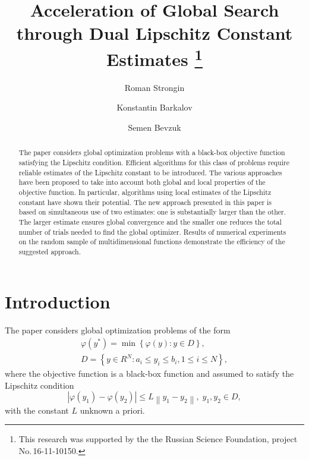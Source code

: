 \documentclass[runningheads]{llncs}
\begin{document}
%
\title{Acceleration of Global Search through Dual Lipschitz Constant Estimates
\thanks{This research was supported by the the Russian Science Foundation,
project No.\,16-11-10150.}}
%
%
\author{Roman Strongin%
\and Konstantin Barkalov%
\and Semen Bevzuk%
}
%
%
%
\maketitle              %
%
\begin{abstract}
The paper considers global optimization problems with a black-box objective 
function satisfying the Lipschitz condition. Efficient algorithms for this 
class of problems require reliable estimates of the Lipschitz constant to be 
introduced. The various approaches have been proposed to take into account both
global and local properties of the objective function. In particular, algorithms
using local estimates of the Lipschitz constant have shown their potential.
The new approach presented in this paper is based on simultaneous use of two
estimates: one is substantially larger than the other. 
The larger estimate ensures global convergence and the smaller one reduces 
the total number of trials needed to find the global optimizer.
Results of numerical experiments on the random sample of multidimensional 
functions demonstrate the efficiency of the suggested approach.  

\end{abstract}
%
%
%
\section{Introduction}

The paper considers global optimization problems of the form 
\begin{gather}
 \varphi(y^\ast)=\min{\left\{\varphi(y):y\in D\right\}}, \label{problem}\\
 D=\left\{y\in R^N: a_i\leq y_i \leq b_i, 1\leq i \leq N\right\} \label{D},
\end{gather}
where the objective function is a black-box function and assumed to satisfy the Lipschitz condition
\[
\left|\varphi(y_1)-\varphi(y_2)\right|\leq L\left\|y_1-y_2\right\|,\; y_1,y_2 \in D,
\]
with the constant $L$ unknown a priori.
\end{document}
